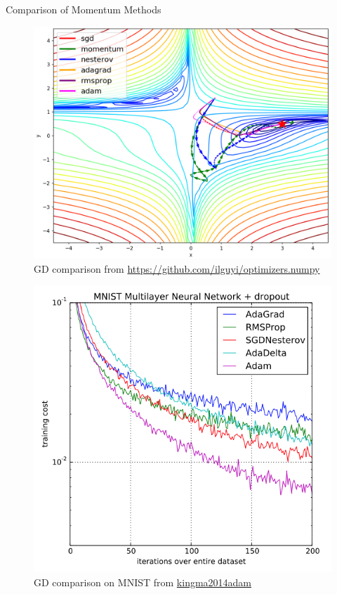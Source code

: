 \documentclass[serif, aspectratio=169]{beamer}
\begin{document}
\begin{frame}{Comparison of Momentum Methods}
    \begin{minipage}{0.5\textwidth}
        \centering
        \begin{center}
        \begin{figure}
        \centering
            \includegraphics[width=1\linewidth]{pic/gd_comparison.png}
            \caption{\footnotesize GD comparison from \url{https://github.com/ilguyi/optimizers.numpy}}
        \end{figure}
        \end{center}
    \end{minipage}%
    \begin{minipage}{0.5\textwidth}
        \centering
        \begin{center}
        \begin{figure}
        \centering
            \includegraphics[width=0.9\linewidth]{pic/Adam_training_kingma2015.png}
            \caption{\footnotesize GD comparison on MNIST from \url{kingma2014adam}}
        \end{figure}
        \end{center}
    \end{minipage}
\end{frame}
\end{document}
